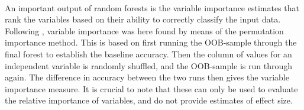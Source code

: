 \documentclass[12pt, a4paper]{article}
\begin{document}
\noindent{}\\ 

An important output of random forests is the variable importance estimates that rank the variables based on their ability to correctly classify the input data. Following \cite{parr2018}, variable importance was here found by means of the permutation importance method. This is based on first running the OOB-sample through the final forest to establish the baseline accuracy. Then the column of values for an independent variable is randomly shuffled, and the OOB-sample is run through again. The difference in accuracy between the two runs then gives the variable importance measure. It is crucial to note that these can only be used to evaluate the relative importance of variables, and do not provide estimates of effect size. \par
\end{document}
